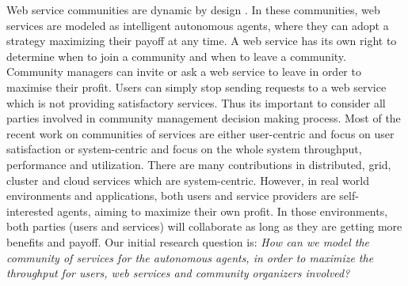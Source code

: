 Web service communities are dynamic by design \cite{DBLP:journals/ijebr/MaamarSTBB09}. In these communities, web services are modeled as intelligent autonomous agents, where they can adopt a strategy maximizing their payoff at any time. A web service has its own right to determine when to join a community and when to leave a community. Community managers can invite or ask a web service to leave in order to maximise their profit. Users can simply stop sending requests to a web service which is not providing satisfactory services. Thus its important to consider all parties involved in community management decision making process. Most of the recent work on communities of services are either
user-centric and focus on user satisfaction
\cite{Chun02user-centricperformance} or system-centric and focus
on the whole system throughput, performance and utilization. There
are many contributions in distributed, grid, cluster and cloud
services which are system-centric. However, in real world
environments and applications, both users and service providers
are self-interested agents, aiming to maximize their own profit.
In those environments, both parties (users and services) will
collaborate as long as they are getting more benefits and payoff.
Our initial research question is:
\emph{How can we model the community of services for the autonomous agents, in order to maximize the throughput for users, web services and community organizers involved?}



